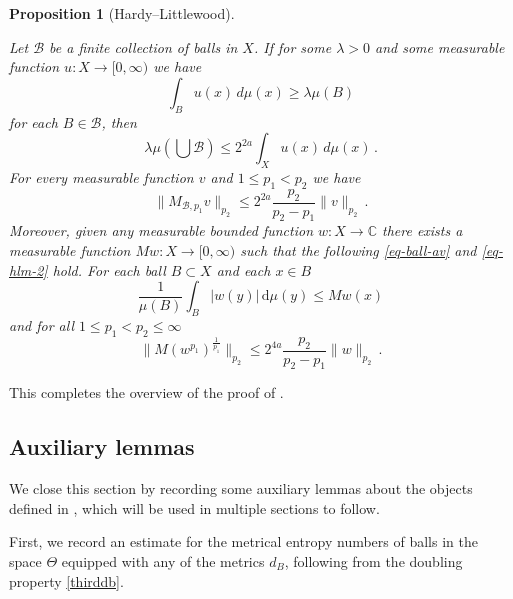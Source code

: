 \documentclass[10pt,a4paper]{article}
\theoremstyle{plain}
\newtheorem{proposition}[theorem]{Proposition}
\theoremstyle{definition}
\numberwithin{equation}{subsection}
\newcommand{\Mf}{{\Theta}}
\newcommand{\lean}[1]{}
\newcommand{\uses}[1]{}
\newcommand{\leanok}{}
\def\C{\mathbb{C}}
\begin{document}
\begin{proposition}[Hardy--Littlewood]
\label{Hardy-Littlewood}
\leanok
\lean{measure_biUnion_le_lintegral, hasStrongType_maximalFunction,
measurable_maximalFunction, laverage_le_globalMaximalFunction}
\uses{layer-cake-representation}
   Let $\mathcal{B}$ be a finite collection of balls in $X$.
If for some $\lambda>0$ and some measurable function $u:X\to [0,\infty)$ we have
\begin{equation}\label{eq-ball-assumption}
\int_{B} u(x)\, d\mu(x)\ge \lambda \mu(B)
\end{equation}
for each $B\in \mathcal{B}$, then
\begin{equation}\label{eq-besico}
    \lambda \mu(\bigcup \mathcal{B}) \le 2^{2a}\int_X u(x)\, d\mu(x)\, .
\end{equation}
For every measurable function $v$
and $1\le p_1<p_2$ we have
\begin{equation}\label{eq-hlm}
    \|M_{\mathcal{B},p_1} v\|_{p_2}\le 2^{2a}\frac{p_2}{p_2-p_1} \|v\|_{p_2}\, .
\end{equation}
Moreover, given any measurable bounded function $w: X \to \C$ there exists a measurable function $Mw: X \to [0, \infty)$ such that the following \eqref{eq-ball-av} and \eqref{eq-hlm-2} hold. For each ball $B \subset X$ and each $x \in B$
\begin{equation}
    \label{eq-ball-av}
    \frac{1}{\mu(B)} \int_{B} |w(y)| \, \mathrm{d}\mu(y) \le Mw(x)
\end{equation}
and for all $1 \le p_1 < p_2 \le \infty$
\begin{equation}
    \label{eq-hlm-2}
    \|M(w^{p_1})^{\frac{1}{p_1}}\|_{p_2} \le 2^{4a} \frac{p_2}{p_2-p_1}\|w\|_{p_2}\,.
\end{equation}

\end{proposition}

This completes the overview of the proof of .

\subsection{Auxiliary lemmas}
\label{global-auxiliary-lemmas}
We close this section by recording some auxiliary lemmas about the objects defined in , which will be used in multiple sections to follow.

First, we record an estimate for the metrical entropy numbers of balls in the space $\Mf$ equipped with any of the metrics $d_B$, following from the doubling property \eqref{thirddb}.
\end{document}

